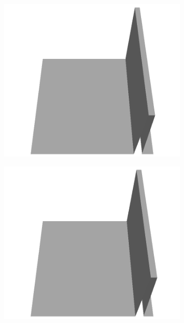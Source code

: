 \documentclass[../document.tex]{subfiles}
\begin{document}
\begin{figure}[H]
\begin{subfigure}[b]{0.065\textwidth}
    \includegraphics[width=\linewidth]{../img/5/custom_patches/walls_front/all/15-3d.png}
    \end{subfigure}
    \begin{subfigure}[b]{0.065\textwidth}
    \includegraphics[width=\linewidth]{../img/5/custom_patches/walls_front/all/14-3d.png}
    \end{subfigure}
    \begin{subfigure}[b]{0.065\textwidth}

\end{subfigure}
\end{figure}
\end{document}
